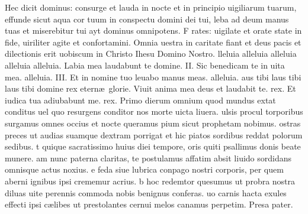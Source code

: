 \documentclass[letter,12pt]{book}
\newcommand*\zallmancaps{\usefont{U}{Zallman}{xl}{n}}
\begin{document}
\lettrine[lines=3]{\color{Blue} \zallmancaps H}{}ec dicit dominus: consurge et lauda
in nocte et in principio uigiliarum tuarum, effunde sicut aqua cor tuum in conspectu domini dei tui, leba ad deum manus tuas et miserebitur tui ayt dominus omnipotens.
\lettrine[lines=3]{\color{Blue} \zallmancaps F}{}{\color{Red} rates:} uigilate et orate state in fide, uiriliter agite et confortamini. Omnia uestra in caritate fiant et deus pacis et dilectionis erit uobiscum in Christo Ihesu Domino Nostro.
lleluia alleluia alleluia alleluia alleluia. {\color{Red} L}abia mea laudabunt te domine. {II. \color{Red} S}ic benedicam te in uita mea. alleluia. {III. \color{Red} E}t in nomine tuo leuabo manus meas. alleluia.
aus tibi laus tibi laus tibi domine rex etern\ae \ glorie. Viuit anima mea deus et laudabit te. rex. Et iudica tua adiubabunt me. rex.
\lettrine[lines=4]{\color{Red} \zallmancaps P}{}rimo dierum omnium
quod mundus extat conditus
uel quo resurgens conditor
nos morte uicta liuera.
ulsis procul torporibus
surgamus omnes occius
et nocte queramus pium
sicut prophetam nobimus.
ostras preces ut audias
suamque dextram porrigat
et hic piatos sordibus
reddat polorum sedibus.
t quique sacratissimo
huius diei tempore,
oris quiti psallimus
donis beate munere.
am nunc paterna claritas,
te postulamus affatim
absit liuido sordidans
omnisque actus noxius.
e feda siue lubrica
conpago nostri corporis,
per quem aberni ignibus
ipsi crememur acrius.
b hoc redemtor quesumus
ut probra nostra diluas
uite perennis commoda
nobis benignus conferas.
uo carnis hacta exules
effecti ipsi c\ae libes
ut prestolantes cernui
melos canamus perpetim. {\color{Red} P}resa pater.
\end{document}
